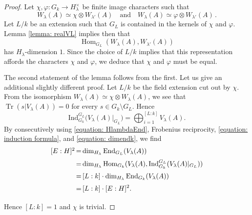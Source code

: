 \documentclass[10pt,a4paper]{amsart}
\newcommand{\End}{\operatorname{End}}
\newcommand{\Hom}{\operatorname{Hom}}
\newcommand{\Ind}{\mathrm{Ind}}
\newcommand{\Tr}{\operatorname{Tr}}
\begin{document}
\begin{proof}
Let $\chi,\varphi \colon G_k\rightarrow H_\lambda^ \times$ be finite image characters such that 
$$
W_\lambda(A)\simeq \chi\otimes W_{\lambda'} (A)\quad \text{and} \quad W_\lambda(A)\simeq \varphi\otimes W_{\lambda'} (A)\,.
$$
Let $L/k$ be an extension such that $G_L$ is contained in the kernels of $\chi$ and $\varphi$. Lemma \ref{lemma: realVL} implies then that  
$$
\Hom_{G_L}(W_\lambda(A),W_{\lambda'}(A))
$$
has $H_\lambda$-dimension $1$. Since the choice of $L/k$ implies that this representation affords the characters $\chi$ and $\varphi$, we deduce that $\chi$ and $\varphi$ must be equal. 

The second statement of the lemma follows from the first. Let us give an additional slightly different proof.
Let $L/k$ be the field extension cut out by $\chi$. From the isomorphism $W_\lambda(A) \simeq \chi \otimes W_\lambda (A)$, we see that $\Tr(s|V_\lambda(A))=0$ for every $s\in G_k\setminus G_L$.
Hence
\begin{equation}\label{equation: induction formula}
\Ind^{G_L}_{G_k}\big(V_{\lambda}(A)|_{G_L}\big)=\bigoplus_{i=1}^{[L:k]}V_{\lambda}(A).
\end{equation}
By consecutively using \eqref{equation: HlambdaEnd}, Frobenius reciprocity, \eqref{equation: induction formula}, and \eqref{equation: dimendk}, we find
$$
\begin{array}{l@{\,=\,}l}
[E:H]^2 & \displaystyle{ \dim_{H_\lambda} \End_{G_L}(V_\lambda(A))}\\[6pt]
 & \displaystyle{\dim_{H_\lambda} \Hom_{G_k}(V_\lambda(A),\Ind^{G_L}_{G_k}(V_\lambda(A)|_{G_L}))}\\[6pt]
 & \displaystyle{[L:k]\cdot \dim_{H_\lambda} \End_{G_k}(V_\lambda(A))}\\[6pt]
  & \displaystyle{[L:k]\cdot [E:H]^2.}\\[6pt]
\end{array}
$$
Hence $[L:k]=1$ and $\chi$ is trivial.
\end{proof}
\end{document}

